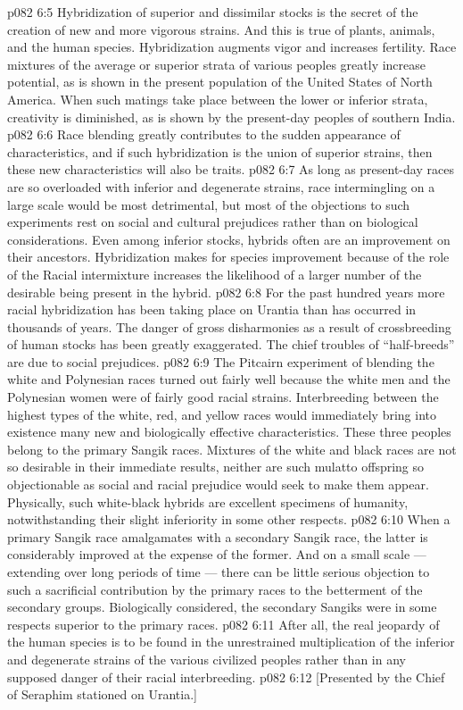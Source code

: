 \vs p082 6:5 Hybridization of superior and dissimilar stocks is the secret of the creation of new and more vigorous strains. And this is true of plants, animals, and the human species. Hybridization augments vigor and increases fertility. Race mixtures of the average or superior strata of various peoples greatly increase  potential, as is shown in the present population of the United States of North America. When such matings take place between the lower or inferior strata, creativity is diminished, as is shown by the present\hyp{}day peoples of southern India.
\vs p082 6:6 Race blending greatly contributes to the sudden appearance of  characteristics, and if such hybridization is the union of superior strains, then these new characteristics will also be  traits.
\vs p082 6:7 As long as present\hyp{}day races are so overloaded with inferior and degenerate strains, race intermingling on a large scale would be most detrimental, but most of the objections to such experiments rest on social and cultural prejudices rather than on biological considerations. Even among inferior stocks, hybrids often are an improvement on their ancestors. Hybridization makes for species improvement because of the role of the  Racial intermixture increases the likelihood of a larger number of the desirable  being present in the hybrid.
\vs p082 6:8 \pc For the past hundred years more racial hybridization has been taking place on Urantia than has occurred in thousands of years. The danger of gross disharmonies as a result of crossbreeding of human stocks has been greatly exaggerated. The chief troubles of “half\hyp{}breeds” are due to social prejudices.
\vs p082 6:9 The Pitcairn experiment of blending the white and Polynesian races turned out fairly well because the white men and the Polynesian women were of fairly good racial strains. Interbreeding between the highest types of the white, red, and yellow races would immediately bring into existence many new and biologically effective characteristics. These three peoples belong to the primary Sangik races. Mixtures of the white and black races are not so desirable in their immediate results, neither are such mulatto offspring so objectionable as social and racial prejudice would seek to make them appear. Physically, such white\hyp{}black hybrids are excellent specimens of humanity, notwithstanding their slight inferiority in some other respects.
\vs p082 6:10 \pc When a primary Sangik race amalgamates with a secondary Sangik race, the latter is considerably improved at the expense of the former. And on a small scale --- extending over long periods of time --- there can be little serious objection to such a sacrificial contribution by the primary races to the betterment of the secondary groups. Biologically considered, the secondary Sangiks were in some respects superior to the primary races.
\vs p082 6:11 After all, the real jeopardy of the human species is to be found in the unrestrained multiplication of the inferior and degenerate strains of the various civilized peoples rather than in any supposed danger of their racial interbreeding.
\vsetoff
\vs p082 6:12 [Presented by the Chief of Seraphim stationed on Urantia.]

